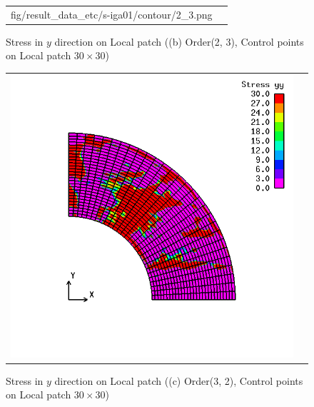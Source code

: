 \begin{figure}[htbp]
\begin{tabular}{cc}
\begin{minipage}[t]{0.45\hsize}
      {fig/result_data_etc/s-iga01/contour/2_3.png}
      \caption{Stress in $y$ direction on Local patch ((b) Order(2, 3), Control points on Local patch $30\times 30$)}
      \label{fig:contour23}
    \end{minipage}
  \end{tabular}
\end{figure}

\newpage

\begin{figure}[htbp]
  \begin{tabular}{cc}
    \begin{minipage}[t]{0.45\hsize}
      \centering
      \includegraphics[keepaspectratio, scale=0.3]
      {fig/result_data_etc/s-iga01/contour/3_2.png}
      \caption{Stress in $y$ direction on Local patch ((c) Order(3, 2), Control points on Local patch $30\times 30$)}
      \label{fig:contour32}
    \end{minipage} &
    \begin{minipage}[t]{0.45\hsize}
      \centering

\end{minipage}
\end{tabular}
\end{figure}
